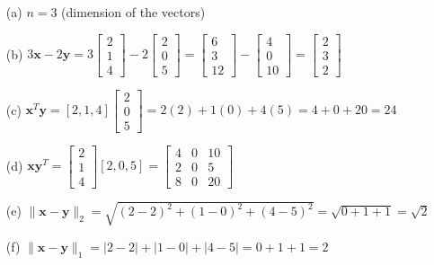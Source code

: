\documentclass{article}
\begin{document}
\begin{enumerate}
\begin{enumerate}
\item[(a)] $n = 3$ (dimension of the vectors)

\item[(b)] $3\mathbf{x} - 2\mathbf{y} = 3\begin{bmatrix} 2 \\ 1 \\ 4 \end{bmatrix} - 2\begin{bmatrix} 2 \\ 0 \\ 5 \end{bmatrix} = \begin{bmatrix} 6 \\ 3 \\ 12 \end{bmatrix} - \begin{bmatrix} 4 \\ 0 \\ 10 \end{bmatrix} = \begin{bmatrix} 2 \\ 3 \\ 2 \end{bmatrix}$

\item[(c)] $\mathbf{x}^T\mathbf{y} = [2, 1, 4] \begin{bmatrix} 2 \\ 0 \\ 5 \end{bmatrix} = 2(2) + 1(0) + 4(5) = 4 + 0 + 20 = 24$

\item[(d)] $\mathbf{x}\mathbf{y}^T = \begin{bmatrix} 2 \\ 1 \\ 4 \end{bmatrix} [2, 0, 5] = \begin{bmatrix} 4 & 0 & 10 \\ 2 & 0 & 5 \\ 8 & 0 & 20 \end{bmatrix}$

\item[(e)] $\|\mathbf{x} - \mathbf{y}\|_2 = \sqrt{(2-2)^2 + (1-0)^2 + (4-5)^2} = \sqrt{0 + 1 + 1} = \sqrt{2}$

\item[(f)] $\|\mathbf{x} - \mathbf{y}\|_1 = |2-2| + |1-0| + |4-5| = 0 + 1 + 1 = 2$


\end{enumerate}
\end{enumerate}
\end{document}
